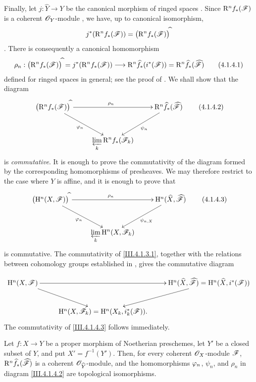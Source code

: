 \begin{env}[4.1.4]
\label{III.4.1.4}
Finally, let $j:\widehat{Y}\to Y$ be the canonical morphism of ringed
spaces .
Since $\mathrm{R}^n f_*(\mathscr{F})$ is a coherent $\mathscr{O}_Y$-module
, we have, up to canonical isomorphism,
\[
  j^*(\mathrm{R}^n f_*(\mathscr{F}))
  =
  \bigl(\mathrm{R}^n f_*(\mathscr{F})\bigr)^{\widehat{\,}}
\]
.
There is consequently a canonical homomorphism
\[
  \rho_n:
  \bigl(\mathrm{R}^n f_*(\mathscr{F})\bigr)^{\widehat{\,}}
  =
  j^*(\mathrm{R}^n f_*(\mathscr{F}))
  \longrightarrow
  \mathrm{R}^n\widehat{f}_*(i^*(\mathscr{F}))
  =
  \mathrm{R}^n\widehat{f}_*(\widehat{\mathscr{F}})
  \tag{4.1.4.1}
  \label{III.4.1.4.1}
\]
defined for ringed spaces in general; see the proof of
.
We shall show that the diagram
\[
  \xymatrix{
    \bigl(\RR^n f_*(\sh{F})\bigr)^{\widehat{\,}}
      \ar[rr]^{\rho_n}\ar[dr]_{\vphi_n}
    &&
    \RR^n\widehat{f}_*(\widehat{\sh{F}})
      \ar[dl]^{\psi_n}\\
    &
    \displaystyle\varprojlim_k\RR^n f_*(\sh{F}_k)
    &
  }
  \tag{4.1.4.2}
  \label{III.4.1.4.2}
\]
is \emph{commutative}.
It is enough to prove the commutativity of the diagram formed by the
corresponding homomorphisms of presheaves.
We may therefore restrict to the case where $Y$ is affine, and it is
enough to prove that
\[
  \xymatrix{
    \bigl(\HH^n(X,\sh{F})\bigr)^{\widehat{\,}}
      \ar[rr]^{\rho_n}\ar[dr]_{\vphi_n}
    &&
    \HH^n(\widehat{X},\widehat{\sh{F}})
      \ar[dl]^{\psi_{n,X}}\\
    &
    \displaystyle\varprojlim_k\HH^n(X,\sh{F}_k)
    &
  }
  \tag{4.1.4.3}
  \label{III.4.1.4.3}
\]
is commutative.
The commutativity of \eqref{III.4.1.3.1}, together with the relations
between cohomology groups established in , gives the
commutative diagram


\[
  \xymatrix{
    \HH^n(X,\sh{F})
      \ar[rr]\ar[dr]
    &&
    \HH^n(\widehat{X},\widehat{\sh{F}})
      =
    \HH^n(\widehat{X},i^*(\sh{F}))
      \ar[dl]\\
    &
    \HH^n(X,\sh{F}_k)
      =
    \HH^n(X_k,i_k^*(\sh{F})).
    &
  }
\]
The commutativity of \eqref{III.4.1.4.3} follows immediately.
\end{env}

\begin{theorem}[4.1.5]
\label{III.4.1.5}
Let $f:X\to Y$ be a proper morphism of Noetherian preschemes, let
$Y'$ be a closed subset of $Y$, and put $X'=f^{-1}(Y')$.
Then, for every coherent $\mathscr{O}_X$-module $\mathscr{F}$, $\mathrm{R}^n\widehat{f}_*(\widehat{\mathscr{F}})$
is a coherent $\mathscr{O}_{\widehat{Y}}$-module, and the homomorphisms
$\varphi_n$, $\psi_n$, and $\rho_n$ in diagram
\eqref{III.4.1.4.2} are topological isomorphisms.
\end{theorem}

